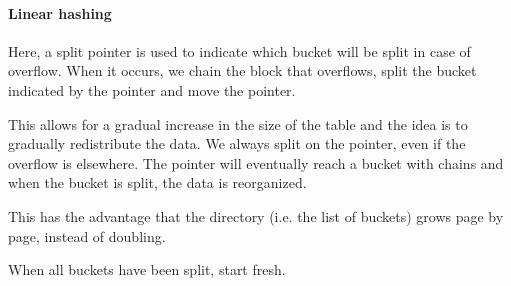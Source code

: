 \paragraph{Linear hashing}
Here, a split pointer is used to indicate which bucket will be split in case of overflow.
When it occurs, we chain the block that overflows, split the bucket indicated by the pointer and move the pointer.

This allows for a gradual increase in the size of the table and the idea is to gradually redistribute the data.
We always split on the pointer, even if the overflow is elsewhere. The pointer will eventually reach a bucket with chains
and when the bucket is split, the data is reorganized.

This has the advantage that the directory (i.e. the list of buckets) grows page by page, instead of doubling.

When all buckets have been split, start fresh.
